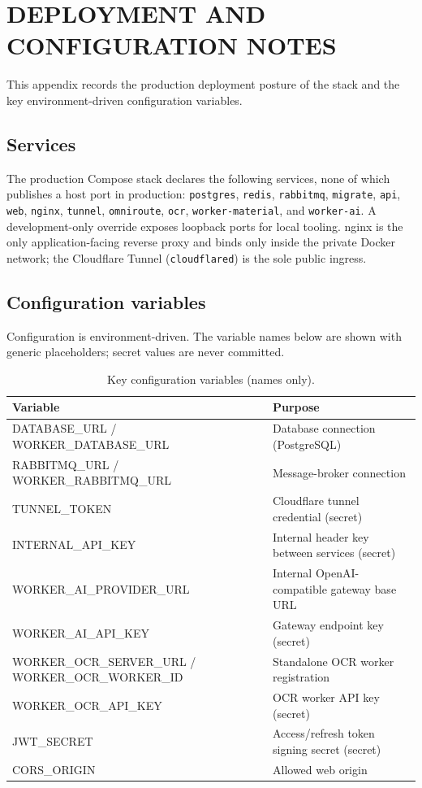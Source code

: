 \chapter{DEPLOYMENT AND CONFIGURATION NOTES}
\thispagestyle{empty}

This appendix records the production deployment posture of the stack and the
key environment-driven configuration variables.

\clearpage

\section{Services}

The production Compose stack declares the following services, none of which
publishes a host port in production: \texttt{postgres}, \texttt{redis},
\texttt{rabbitmq}, \texttt{migrate}, \texttt{api}, \texttt{web},
\texttt{nginx}, \texttt{tunnel}, \texttt{omniroute}, \texttt{ocr},
\texttt{worker-material}, and \texttt{worker-ai}. A development-only override
exposes loopback ports for local tooling. nginx is the only
application-facing reverse proxy and binds only inside the private Docker
network; the Cloudflare Tunnel (\texttt{cloudflared}) is the sole public
ingress.

\section{Configuration variables}

Configuration is environment-driven. The variable names below are shown with
generic placeholders; secret values are never committed.

\begin{table}[H]
\centering
\caption{Key configuration variables (names only).}
\label{tab:env}
\small
\begin{tabular}{@{}p{7.4cm}p{\dimexpr\textwidth-7.4cm-12pt\relax}@{}}
\toprule
\textbf{Variable} & \textbf{Purpose} \\
\midrule
DATABASE\_URL / WORKER\_DATABASE\_URL & Database connection (PostgreSQL) \\
RABBITMQ\_URL / WORKER\_RABBITMQ\_URL & Message-broker connection \\
TUNNEL\_TOKEN & Cloudflare tunnel credential (secret) \\
INTERNAL\_API\_KEY & Internal header key between services (secret) \\
WORKER\_AI\_PROVIDER\_URL & Internal OpenAI-compatible gateway base URL \\
WORKER\_AI\_API\_KEY & Gateway endpoint key (secret) \\
WORKER\_OCR\_SERVER\_URL / WORKER\_OCR\_WORKER\_ID & Standalone OCR worker registration \\
WORKER\_OCR\_API\_KEY & OCR worker API key (secret) \\
JWT\_SECRET & Access/refresh token signing secret (secret) \\
CORS\_ORIGIN & Allowed web origin \\
\bottomrule
\end{tabular}
\end{table}

